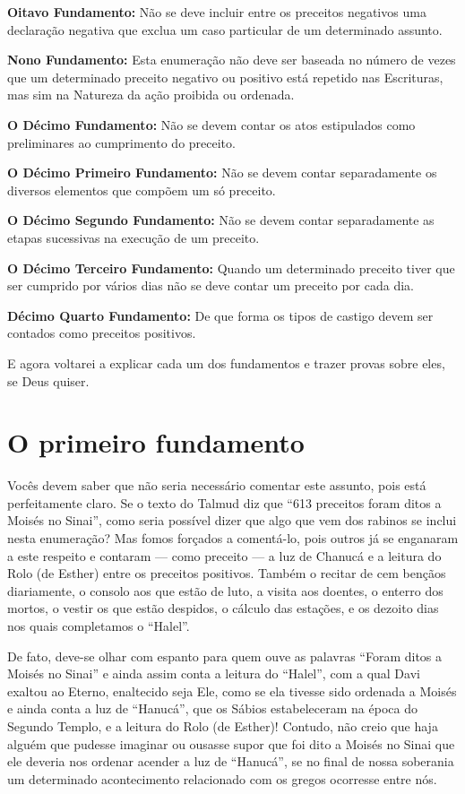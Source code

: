 \textbf{Oitavo Fundamento:} Não se deve incluir entre os preceitos
negativos uma declaração negativa que exclua um caso particular de um
determinado assunto.

\textbf{Nono Fundamento:} Esta enumeração não deve ser baseada no
número de vezes que um determinado preceito negativo ou positivo está
repetido nas Escrituras, mas sim na Natureza da ação proibida ou
ordenada.

\textbf{O Décimo Fundamento:} Não se devem contar os atos estipulados
como preliminares ao cumprimento do preceito.

\textbf{O Décimo Primeiro Fundamento:} Não se devem contar separadamente
os diversos elementos que compõem um só preceito.

\textbf{O Décimo Segundo Fundamento:} Não se devem contar separadamente
as etapas sucessivas na execução de um preceito.

\textbf{O Décimo Terceiro Fundamento:} Quando um determinado preceito
tiver que ser cumprido por vários dias não se deve contar um preceito
por cada dia.

\textbf{Décimo Quarto Fundamento:} De que forma os tipos de castigo
devem ser contados como preceitos positivos.

E agora voltarei a explicar cada um dos fundamentos e trazer provas
sobre eles, se Deus quiser.

\chapter*{O primeiro fundamento}

Vocês devem saber que não seria necessário comentar este
assunto, pois está perfeitamente claro. Se o texto do Talmud diz que
``613 preceitos foram ditos a Moisés no Sinai'', como
seria possível dizer que algo que vem dos rabinos se inclui nesta
enumeração? Mas fomos forçados a comentá-lo, pois outros já se enganaram
a este respeito e contaram --- como preceito --- a luz de Chanucá e
a leitura do Rolo (de Esther) entre os preceitos positivos. Também o
recitar de cem bençãos diariamente, o consolo aos que estão de luto, a
visita aos doentes, o enterro dos mortos, o vestir os que estão
despidos, o cálculo das estações, e os dezoito dias nos quais
completamos o ``Halel''.

De fato, deve-se olhar com espanto para quem ouve as palavras ``Foram
ditos a Moisés no Sinai'' e ainda assim conta a leitura do ``Halel'',
com a qual Davi exaltou ao Eterno, enaltecido seja Ele, como se ela
tivesse sido ordenada a Moisés e ainda conta a luz de ``Hanucá'', que
os Sábios estabeleceram na época do Segundo Templo, e a leitura do Rolo
(de Esther)! Contudo, não creio que haja alguém que pudesse imaginar ou
ousasse supor que foi dito a Moisés no Sinai que ele deveria nos ordenar
acender a luz de ``Hanucá'', se no final de nossa soberania um
determinado acontecimento relacionado com os gregos ocorresse entre nós.

